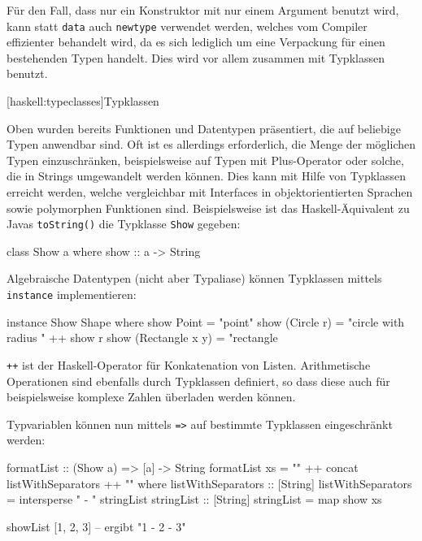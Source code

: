 \documentclass[12pt, a4paper, bibgerm]{scrbook}
\newenvironment{DIFnomarkup}{}{}
\newcommand\icode[1]{\lstinline?#1?}
\newcommand\lsection{}
\begin{document}
Für den Fall, dass nur ein Konstruktor mit nur einem Argument benutzt
wird, kann statt \icode{data} auch \icode{newtype} verwendet
werden, welches vom Compiler effizienter behandelt wird, da es sich
lediglich um eine Verpackung für einen bestehenden Typen handelt. Dies
wird vor allem zusammen mit Typklassen benutzt.

\lsection[haskell:typeclasses]{Typklassen}

Oben wurden bereits Funktionen und Datentypen präsentiert, die auf
beliebige Typen anwendbar sind. Oft ist es allerdings erforderlich, die
Menge der möglichen Typen einzuschränken, beispielsweise auf Typen mit
Plus-Operator oder solche, die in Strings umgewandelt werden
können. Dies kann mit Hilfe von Typklassen erreicht werden, welche
vergleichbar mit Interfaces in objektorientierten Sprachen sowie
polymorphen Funktionen sind. Beispielsweise ist das Haskell-Äquivalent
zu Javas \icode{toString()} die Typklasse \icode{Show} gegeben:
\begin{DIFnomarkup}\begin{code}
class Show a where
  show :: a -> String
\end{code}\end{DIFnomarkup}
Algebraische Datentypen (nicht aber Typaliase) können Typklassen mittels
\icode{instance} implementieren:
\begin{DIFnomarkup}\begin{code}
instance Show Shape where
  show Point           = "point"
  show (Circle r)      = "circle with radius " ++ show r
  show (Rectangle x y) = "rectangle
\end{code}\end{DIFnomarkup}
\icode{++} ist der Haskell-Operator für Konkatenation von Listen.
Arithmetische Operationen sind ebenfalls durch Typklassen definiert, so
dass diese auch für beispielsweise komplexe Zahlen überladen werden
können.

Typvariablen können nun mittels \icode{=>} auf bestimmte Typklassen
eingeschränkt werden:
\begin{DIFnomarkup}\begin{code}
formatList :: (Show a) => [a] -> String
formatList xs = "{" ++ concat listWithSeparators ++ "}"
  where listWithSeparators :: [String]
        listWithSeparators = intersperse " - " stringList
        stringList :: [String]
        stringList = map show xs

showList [1, 2, 3] -- ergibt "{1 - 2 - 3}"
\end{code}\end{DIFnomarkup}
\end{document}
